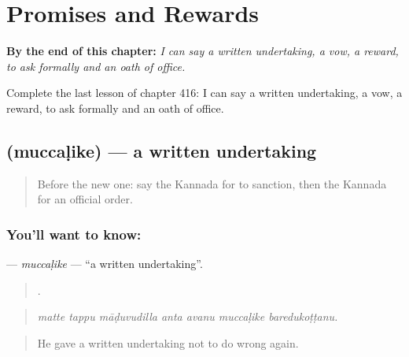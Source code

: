 
\chapter{Promises and Rewards}
\label{ch:ka-promises-and-rewards}

\begin{chapteropening}
\textbf{By the end of this chapter:} \emph{I can say a written undertaking, a vow, a reward, to ask formally and an oath of office.}

Complete the last lesson of chapter 416: I can say a written undertaking, a vow, a reward, to ask formally and an oath of office.
\end{chapteropening}

\section[\texorpdfstring{\kn{ಮುಚ್ಚಳಿಕೆ} (muccaḷike)}{ಮುಚ್ಚಳಿಕೆ (muccaḷike)}]{ (muccaḷike) — a written undertaking}

\label{lesson:KA-C416-muccalike}



\begin{quote}
Before the new one: say the Kannada for to sanction, then the Kannada for an official order.
\end{quote}

\subsection*{You'll want to know: }
\textbf{} — \emph{muccaḷike} — \textquotedblleft{}a written undertaking\textquotedblright{}.

\begin{quote}
      .
\end{quote}

\begin{quote}
\emph{matte tappu māḍuvudilla anta avanu muccaḷike baredukoṭṭanu.}
\end{quote}

\begin{quote}
He gave a written undertaking not to do wrong again.
\end{quote}

